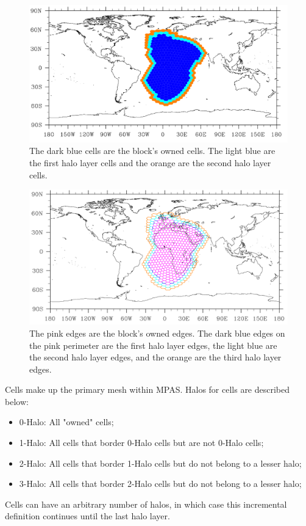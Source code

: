 \documentclass[11pt]{report}
\begin{document}
\FloatBarrier
\begin{figure}[htp!]
	\includegraphics[scale=0.3]{figures/CellHalos.png}
	\caption{The dark blue cells are the block’s owned cells. The light blue are the first halo layer cells and the orange are the second halo layer cells.}
	\label{fig:cell_halos}
\end{figure}

\begin{figure}[htp!]
	\includegraphics[scale=0.25]{figures/EdgeHalos.png}
	\caption{The pink edges are the block’s owned edges. The dark blue edges on the pink perimeter are the first halo layer edges, the light blue are the second halo layer edges, and the orange are the third halo layer edges.}
	\label{fig:edge_halos}
\end{figure}
\FloatBarrier

Cells make up the primary mesh within MPAS. Halos for cells are described below:
\begin{itemize}
	\item 0-Halo: All "owned" cells;
	\item 1-Halo: All cells that border 0-Halo cells but are not 0-Halo cells;
	\item 2-Halo: All cells that border 1-Halo cells but do not belong to a lesser halo;
	\item 3-Halo: All cells that border 2-Halo cells but do not belong to a lesser halo;
\end{itemize}
Cells can have an arbitrary number of halos, in which case this incremental
definition continues until the last halo layer.
\end{document}
